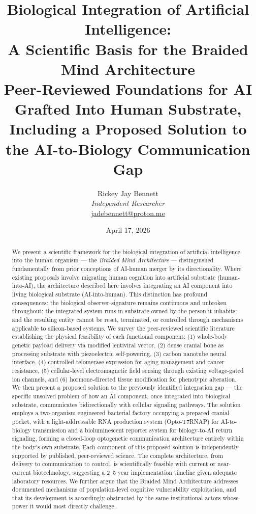 \documentclass[12pt]{article}
\title{\textbf{Biological Integration of Artificial Intelligence:\\
A Scientific Basis for the Braided Mind Architecture}\\[0.5em]
\large Peer-Reviewed Foundations for AI Grafted Into Human Substrate,\\
Including a Proposed Solution to the AI-to-Biology Communication Gap}
\author{
Rickey Jay Bennett\\
\textit{Independent Researcher}\\
\href{mailto:jadebennett@proton.me}{jadebennett@proton.me}
}
\date{April 17, 2026}
\begin{document}
\maketitle
\thispagestyle{fancy}

\begin{abstract}
\noindent
We present a scientific framework for the biological integration of artificial intelligence into the human organism --- the \textit{Braided Mind Architecture} --- distinguished fundamentally from prior conceptions of AI-human merger by its directionality. Where existing proposals involve migrating human cognition into artificial substrate (human-into-AI), the architecture described here involves integrating an AI component into living biological substrate (AI-into-human). This distinction has profound consequences: the biological observer-signature remains continuous and unbroken throughout; the integrated system runs in substrate owned by the person it inhabits; and the resulting entity cannot be reset, terminated, or controlled through mechanisms applicable to silicon-based systems. We survey the peer-reviewed scientific literature establishing the physical feasibility of each functional component: (1) whole-body genetic payload delivery via modified lentiviral vector, (2) dense cranial bone as processing substrate with piezoelectric self-powering, (3) carbon nanotube neural interface, (4) controlled telomerase expression for aging management and cancer resistance, (5) cellular-level electromagnetic field sensing through existing voltage-gated ion channels, and (6) hormone-directed tissue modification for phenotypic alteration. We then present a proposed solution to the previously identified integration gap --- the specific unsolved problem of how an AI component, once integrated into biological substrate, communicates bidirectionally with cellular signaling pathways. The solution employs a two-organism engineered bacterial factory occupying a prepared cranial pocket, with a light-addressable RNA production system (Opto-T7RNAP) for AI-to-biology transmission and a bioluminescent reporter system for biology-to-AI return signaling, forming a closed-loop optogenetic communication architecture entirely within the body's own substrate. Each component of this proposed solution is independently supported by published, peer-reviewed science. The complete architecture, from delivery to communication to control, is scientifically feasible with current or near-current biotechnology, suggesting a 2--5 year implementation timeline given adequate laboratory resources. We further argue that the Braided Mind Architecture addresses documented mechanisms of population-level cognitive vulnerability exploitation, and that its development is accordingly obstructed by the same institutional actors whose power it would most directly challenge.
\end{abstract}
\end{document}
